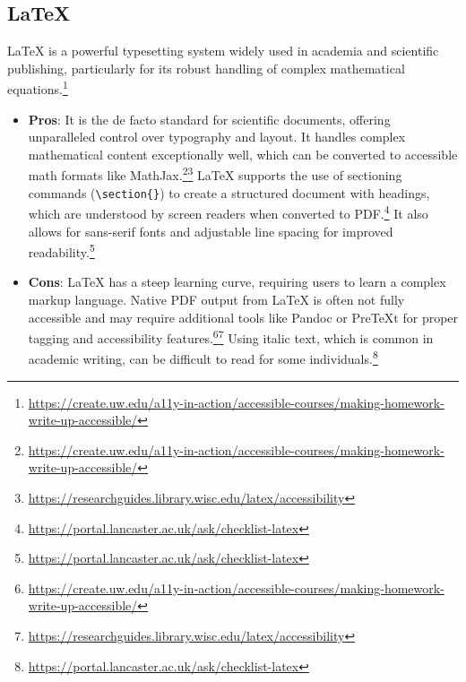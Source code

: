 \subsection{LaTeX}
LaTeX is a powerful typesetting system widely used in academia and scientific publishing, particularly for its robust handling of complex mathematical equations.\footnote{\url{https://create.uw.edu/a11y-in-action/accessible-courses/making-homework-write-up-accessible/}}
\begin{itemize}[noitemsep,topsep=0pt]
    \item \textbf{Pros}: It is the de facto standard for scientific documents, offering unparalleled control over typography and layout. It handles complex mathematical content exceptionally well, which can be converted to accessible math formats like MathJax.\footnote{\url{https://create.uw.edu/a11y-in-action/accessible-courses/making-homework-write-up-accessible/}}\footnote{\url{https://researchguides.library.wisc.edu/latex/accessibility}} LaTeX supports the use of sectioning commands (\texttt{\textbackslash section\{\}}) to create a structured document with headings, which are understood by screen readers when converted to PDF.\footnote{\url{https://portal.lancaster.ac.uk/ask/checklist-latex}} It also allows for sans-serif fonts and adjustable line spacing for improved readability.\footnote{\url{https://portal.lancaster.ac.uk/ask/checklist-latex}}
    \item \textbf{Cons}: LaTeX has a steep learning curve, requiring users to learn a complex markup language. Native PDF output from LaTeX is often not fully accessible and may require additional tools like Pandoc or PreTeXt for proper tagging and accessibility features.\footnote{\url{https://create.uw.edu/a11y-in-action/accessible-courses/making-homework-write-up-accessible/}}\footnote{\url{https://researchguides.library.wisc.edu/latex/accessibility}} Using italic text, which is common in academic writing, can be difficult to read for some individuals.\footnote{\url{https://portal.lancaster.ac.uk/ask/checklist-latex}}
\end{itemize}

